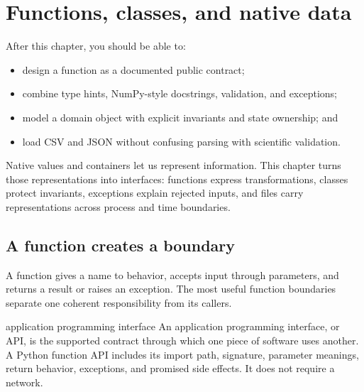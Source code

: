 \chapter{Functions, classes, and native data}
\label{ch:interfaces-models-files}

\begin{learningobjectives}
After this chapter, you should be able to:
\begin{itemize}
  \item design a function as a documented public contract;
  \item combine type hints, NumPy-style docstrings, validation, and exceptions;
  \item model a domain object with explicit invariants and state ownership; and
  \item load CSV and JSON without confusing parsing with scientific validation.
\end{itemize}
\end{learningobjectives}

\begin{chapterconnection}
Native values and containers let us represent information. This chapter turns
those representations into interfaces: functions express transformations,
classes protect invariants, exceptions explain rejected inputs, and files carry
representations across process and time boundaries.
\end{chapterconnection}

\section{A function creates a boundary}

A function gives a name to behavior, accepts input through parameters, and
returns a result or raises an exception. The most useful function boundaries
separate one coherent responsibility from its callers.

\begin{definitionbox}{application programming interface}
An application programming interface, or API, is the supported contract through
which one piece of software uses another. A Python function API includes its
import path, signature, parameter meanings, return behavior, exceptions, and
promised side effects. It does not require a network.
\end{definitionbox}

